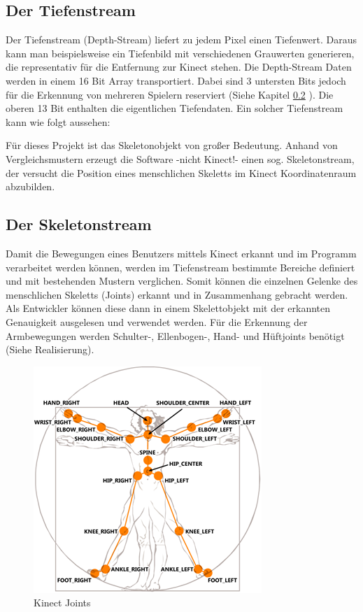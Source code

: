 \subsection{Der Tiefenstream}
Der Tiefenstream (Depth-Stream) liefert zu jedem Pixel einen Tiefenwert. Daraus kann man beispielsweise
ein Tiefenbild mit verschiedenen Grauwerten generieren, die representativ für die Entfernung zur Kinect
stehen. Die Depth-Stream Daten werden in einem 16 Bit Array transportiert. Dabei sind 3 untersten Bits
jedoch für die Erkennung von mehreren Spielern reserviert (Siehe Kapitel \ref{skeleton} ). Die oberen 13 Bit enthalten die eigentlichen Tiefendaten. Ein solcher Tiefenstream
kann wie folgt aussehen:


Für dieses Projekt ist das Skeletonobjekt von großer Bedeutung. Anhand von Vergleichsmustern erzeugt die Software -nicht Kinect!- einen sog. Skeletonstream, der versucht die Position eines menschlichen Skeletts im Kinect Koordinatenraum abzubilden.\cite{SWB-376536934}

\subsection{Der Skeletonstream}\label{skeleton}
Damit die Bewegungen eines Benutzers mittels Kinect erkannt und im Programm verarbeitet werden können, werden im Tiefenstream bestimmte Bereiche definiert und mit bestehenden Mustern verglichen. Somit können die einzelnen Gelenke des menschlichen Skeletts (Joints) erkannt und in Zusammenhang gebracht werden. Als Entwickler können diese dann in einem Skelettobjekt mit der erkannten Genauigkeit ausgelesen und verwendet werden. Für die Erkennung der Armbewegungen werden Schulter-, Ellenbogen-, Hand- und Hüftjoints benötigt (Siehe Realisierung).

\begin{figure}[H]						
	\centering							
	\includegraphics[scale=1.0]{Bilder/kinect_joints.png}			
	\caption{Kinect Joints \cite{ws:microsoft_jointType}}						
	\label{f:kinect_joints}						
\end{figure}



